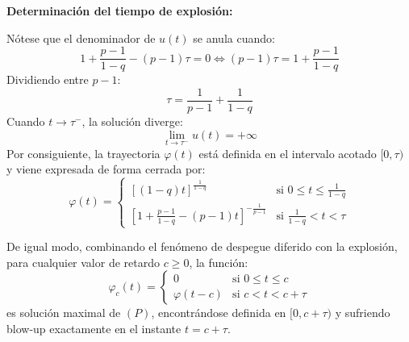 {    \textbf{Determinación del tiempo de explosión:}

    Nótese que el denominador de $u(t)$ se anula cuando:
    \[
        1 + \frac{p - 1}{1 - q} - (p - 1)\tau = 0 \iff (p - 1)\tau = 1 + \frac{p - 1}{1 - q}
    \]
    Dividiendo entre $p - 1$:
    \[
        \tau = \frac{1}{p - 1} + \frac{1}{1 - q}
    \]
    Cuando $t \to \tau^-$, la solución diverge:
    \[
        \lim_{t \to \tau^-} u(t) = +\infty
    \]
    Por consiguiente, la trayectoria $\varphi(t)$ está definida en el intervalo acotado $[0, \tau)$ y viene expresada de forma cerrada por:
    \[
        \varphi(t) =
        \begin{cases}
            \left[ (1 - q)t \right]^{\frac{1}{1-q}} & \text{si } 0 \leq t \leq \frac{1}{1 - q} \\[2ex]
            \left[ 1 + \frac{p - 1}{1 - q} - (p - 1)t \right]^{-\frac{1}{p-1}} & \text{si } \frac{1}{1 - q} < t < \tau
        \end{cases}
    \]

    De igual modo, combinando el fenómeno de despegue diferido con la explosión, para cualquier valor de retardo $c \geq 0$, la función:
    \[
        \varphi_c(t) =
        \begin{cases}
            0 & \text{si } 0 \leq t \leq c \\[1ex]
            \varphi(t - c) & \text{si } c < t < c + \tau
        \end{cases}
    \]
    es solución maximal de $(P)$, encontrándose definida en $[0, c + \tau)$ y sufriendo blow-up exactamente en el instante $t = c + \tau$.

    \begin{center}
\end{center}}
